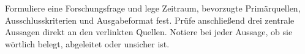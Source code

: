 \begin{praxis}
Formuliere eine Forschungsfrage und lege Zeitraum, bevorzugte Primärquellen, Ausschlusskriterien und Ausgabeformat fest. Prüfe anschließend drei zentrale Aussagen direkt an den verlinkten Quellen. Notiere bei jeder Aussage, ob sie wörtlich belegt, abgeleitet oder unsicher ist.
\end{praxis}
